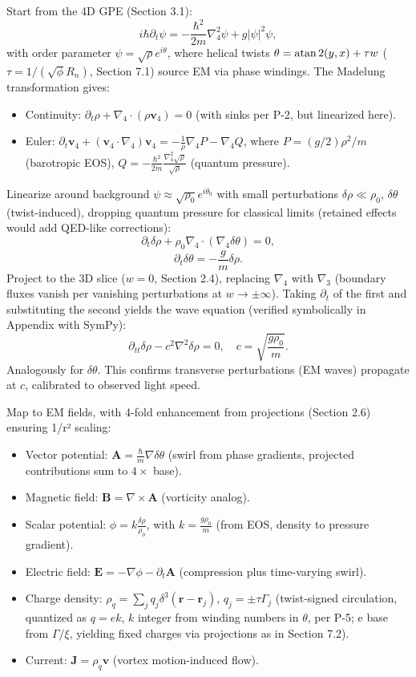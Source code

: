 \documentclass{article}
\begin{document}
Start from the 4D GPE (Section 3.1):
\[
i \hbar \partial_t \psi = -\frac{\hbar^2}{2 m} \nabla_4^2 \psi + g |\psi|^2 \psi,
\]
with order parameter \(\psi = \sqrt{\rho} e^{i \theta}\), where helical twists \(\theta = \atan2(y,x) + \tau w\) (\(\tau = 1 / (\sqrt{\phi} R_n)\), Section 7.1) source EM via phase windings. The Madelung transformation gives:
\begin{itemize}
  \item Continuity: \(\partial_t \rho + \nabla_4 \cdot (\rho \mathbf{v}_4) = 0\) (with sinks per P-2, but linearized here).
  \item Euler: \(\partial_t \mathbf{v}_4 + (\mathbf{v}_4 \cdot \nabla_4) \mathbf{v}_4 = -\frac{1}{\rho} \nabla_4 P - \nabla_4 Q\), where \(P = (g/2) \rho^2 / m\) (barotropic EOS), \(Q = -\frac{\hbar^2}{2 m} \frac{\nabla_4^2 \sqrt{\rho}}{\sqrt{\rho}}\) (quantum pressure).
\end{itemize}

Linearize around background \(\psi \approx \sqrt{\rho_0} e^{i \theta_0}\) with small perturbations \(\delta \rho \ll \rho_0\), \(\delta \theta\) (twist-induced), dropping quantum pressure for classical limits (retained effects would add QED-like corrections):
\[
\partial_t \delta \rho + \rho_0 \nabla_4 \cdot (\nabla_4 \delta \theta) = 0,
\]
\[
\partial_t \delta \theta = -\frac{g}{m} \delta \rho.
\]
Project to the 3D slice (\(w=0\), Section 2.4), replacing \(\nabla_4\) with \(\nabla_3\) (boundary fluxes vanish per vanishing perturbations at \(w \to \pm \infty\)). Taking \(\partial_t\) of the first and substituting the second yields the wave equation (verified symbolically in Appendix with SymPy):
\[
\partial_{tt} \delta \rho - c^2 \nabla^2 \delta \rho = 0, \quad c = \sqrt{\frac{g \rho_0}{m}}.
\]
Analogously for \(\delta \theta\). This confirms transverse perturbations (EM waves) propagate at \(c\), calibrated to observed light speed.

Map to EM fields, with 4-fold enhancement from projections (Section 2.6) ensuring 1/r² scaling:
\begin{itemize}
  \item Vector potential: \(\mathbf{A} = \frac{\hbar}{m} \nabla \delta \theta\) (swirl from phase gradients, projected contributions sum to \(4 \times\) base).
  \item Magnetic field: \(\mathbf{B} = \nabla \times \mathbf{A}\) (vorticity analog).
  \item Scalar potential: \(\phi = k \frac{\delta \rho}{\rho_0}\), with \(k = \frac{g \rho_0}{m}\) (from EOS, density to pressure gradient).
  \item Electric field: \(\mathbf{E} = -\nabla \phi - \partial_t \mathbf{A}\) (compression plus time-varying swirl).
  \item Charge density: \(\rho_q = \sum_j q_j \delta^3(\mathbf{r} - \mathbf{r}_j)\), \(q_j = \pm \tau \Gamma_j\) (twist-signed circulation, quantized as \(q = e k\), \(k\) integer from winding numbers in \(\theta\), per P-5; e base from \(\Gamma / \xi\), yielding fixed charges via projections as in Section 7.2).
  \item Current: \(\mathbf{J} = \rho_q \mathbf{v}\) (vortex motion-induced flow).
\end{itemize}
\end{document}
